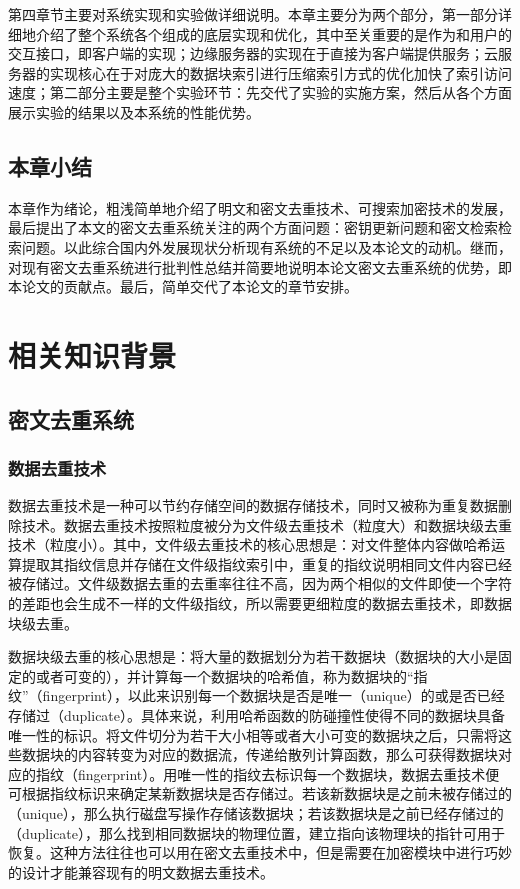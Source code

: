 \documentclass[promaster]{thesis-uestc}
\begin{document}
第四章节主要对系统实现和实验做详细说明。本章主要分为两个部分，第一部分详细地介绍了整个系统各个组成的底层实现和优化，其中至关重要的是作为和用户的交互接口，即客户端的实现；边缘服务器的实现在于直接为客户端提供服务；云服务器的实现核心在于对庞大的数据块索引进行压缩索引方式的优化加快了索引访问速度；第二部分主要是整个实验环节：先交代了实验的实施方案，然后从各个方面展示实验的结果以及本系统的性能优势。

\section{本章小结}
本章作为绪论，粗浅简单地介绍了明文和密文去重技术、可搜索加密技术的发展，最后提出了本文的密文去重系统关注的两个方面问题：密钥更新问题和密文检索检索问题。以此综合国内外发展现状分析现有系统的不足以及本论文的动机。继而，对现有密文去重系统进行批判性总结并简要地说明本论文密文去重系统的优势，即本论文的贡献点。最后，简单交代了本论文的章节安排。

\chapter{相关知识背景}

\section{密文去重系统}

\subsection{数据去重技术}\label{指纹}
数据去重技术是一种可以节约存储空间的数据存储技术，同时又被称为重复数据删除技术。数据去重技术按照粒度被分为文件级去重技术（粒度大）和数据块级去重技术（粒度小）。其中，文件级去重技术的核心思想是：对文件整体内容做哈希运算提取其指纹信息并存储在文件级指纹索引中，重复的指纹说明相同文件内容已经被存储过。文件级数据去重的去重率往往不高，因为两个相似的文件即使一个字符的差距也会生成不一样的文件级指纹，所以需要更细粒度的数据去重技术，即数据块级去重。

数据块级去重的核心思想是：将大量的数据划分为若干数据块（数据块的大小是固定的或者可变的），并计算每一个数据块的哈希值，称为数据块的“指纹”（fingerprint），以此来识别每一个数据块是否是唯一（unique）的或是否已经存储过（duplicate）。具体来说，利用哈希函数的防碰撞性使得不同的数据块具备唯一性的标识。将文件切分为若干大小相等或者大小可变的数据块之后，只需将这些数据块的内容转变为对应的数据流，传递给散列计算函数，那么可获得数据块对应的指纹（fingerprint）。用唯一性的指纹去标识每一个数据块，数据去重技术便可根据指纹标识来确定某新数据块是否存储过。若该新数据块是之前未被存储过的（unique），那么执行磁盘写操作存储该数据块；若该数据块是之前已经存储过的（duplicate），那么找到相同数据块的物理位置，建立指向该物理块的指针可用于恢复。这种方法往往也可以用在密文去重技术中，但是需要在加密模块中进行巧妙的设计才能兼容现有的明文数据去重技术。
\end{document}
